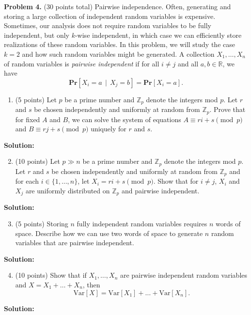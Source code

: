 \documentclass[11pt]{article}
\newcommand{\Var}[1]{\ensuremath{\text{Var}\left[#1\right]}}
\newcommand{\PPr}[1]{\ensuremath{\mathbf{Pr}\left[#1\right]}}
\begin{document}
\newpage\noindent
\textbf{Problem 4.} (30 points total)
Pairwise independence.
\vskip 0.1in\noindent
Often, generating and storing a large collection of independent random variables is expensive. Sometimes, our analysis does not require random variables to be fully independent, but only $k$-wise independent, in which case we can efficiently store realizations of these random variables. In this problem, we will study the case $k=2$ and how such random variables might be generated.
\vskip 0.1in\noindent
A collection $X_1,\ldots,X_n$ of random variables is \emph{pairwise independent} if for all $i\neq j$ and all $a,b\in\mathbb{R}$, we have
\[\PPr{X_i=a\,\mid\,X_j=b}=\PPr{X_i=a}.\]
\begin{enumerate}
\item (5 points)
Let $p$ be a prime number and $\mathbb{Z}_p$ denote the integers mod $p$. 
Let $r$ and $s$ be chosen independently and uniformly at random from $\mathbb{Z}_p$.  
Prove that for fixed $A$ and $B$, we can solve the system of equations $A\equiv ri+s\pmod{p}$ and $B\equiv rj+s\pmod{p}$ uniquely for $r$ and $s$. 
\end{enumerate}

\noindent\textbf{Solution:}












\begin{enumerate}
\setcounter{enumi}{1}
\item (10 points)
Let $p\gg n$ be a prime number and $\mathbb{Z}_p$ denote the integers mod $p$. 
Let $r$ and $s$ be chosen independently and uniformly at random from $\mathbb{Z}_p$ and for each $i\in\{1,\ldots,n\}$, let $X_i=ri+s\pmod{p}$. 
Show that for $i\neq j$, $X_i$ and $X_j$ are uniformly distributed on $\mathbb{Z}_p$ and pairwise independent. 
\end{enumerate}

\noindent\textbf{Solution:}












\begin{enumerate}
\setcounter{enumi}{2}
\item (5 points)
Storing $n$ fully independent random variables requires $n$ words of space. Describe how we can use two words of space to generate $n$ random variables that are pairwise independent. 
\end{enumerate}

\noindent\textbf{Solution:}











\begin{enumerate}
\setcounter{enumi}{3}
\item (10 points)
Show that if $X_1,\ldots,X_n$ are pairwise independent random variables and $X=X_1+\ldots+X_n$, then
\[\Var{X}=\Var{X_1}+\ldots+\Var{X_n}.\]
\end{enumerate}

\noindent\textbf{Solution:}
\end{document}
